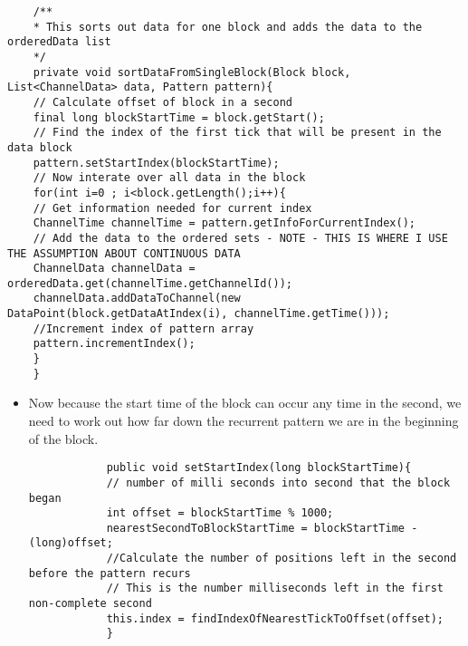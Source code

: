 \documentclass{article}
\begin{document}
\begin{itemize}
\begin{lstlisting}
	/**
	* This sorts out data for one block and adds the data to the orderedData list
	*/
	private void sortDataFromSingleBlock(Block block, List<ChannelData> data, Pattern pattern){
	// Calculate offset of block in a second
	final long blockStartTime = block.getStart();
	// Find the index of the first tick that will be present in the data block
	pattern.setStartIndex(blockStartTime);
	// Now interate over all data in the block
	for(int i=0 ; i<block.getLength();i++){
	// Get information needed for current index
	ChannelTime channelTime = pattern.getInfoForCurrentIndex();
	// Add the data to the ordered sets - NOTE - THIS IS WHERE I USE THE ASSUMPTION ABOUT CONTINUOUS DATA
	ChannelData channelData = orderedData.get(channelTime.getChannelId());
	channelData.addDataToChannel(new DataPoint(block.getDataAtIndex(i), channelTime.getTime()));
	//Increment index of pattern array
	pattern.incrementIndex();
	}
	}
	\end{lstlisting}
		\begin{itemize}
			\item Now because the start time of the block can occur any time in the second, we need to work out how far down the recurrent pattern we are in the beginning of the block.
			\begin{lstlisting}
			public void setStartIndex(long blockStartTime){
			// number of milli seconds into second that the block began
			int offset = blockStartTime % 1000; 
			nearestSecondToBlockStartTime = blockStartTime - (long)offset;
			//Calculate the number of positions left in the second before the pattern recurs
			// This is the number milliseconds left in the first non-complete second
			this.index = findIndexOfNearestTickToOffset(offset);        
			}
			

\end{lstlisting}
\end{itemize}
\end{itemize}
\end{document}
